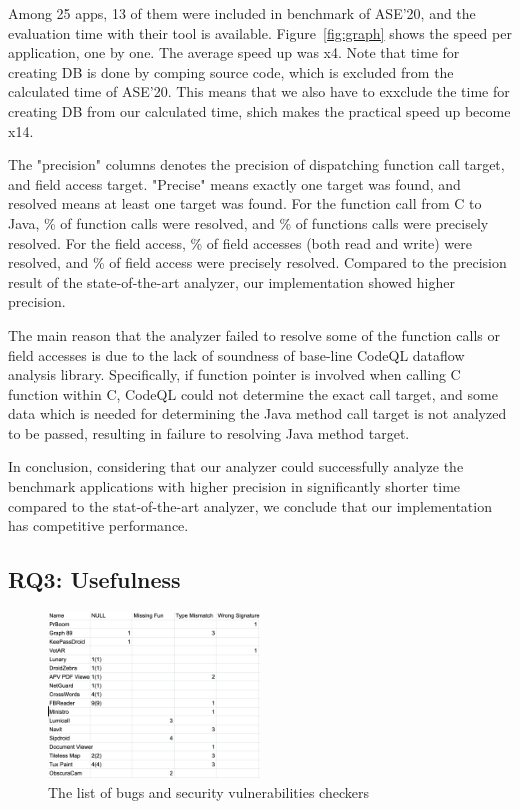 Among 25 apps, 13 of them were included in benchmark of ASE'20, and the
evaluation time with their tool is available.  Figure~\ref{fig:graph} shows the speed per
application, one by one.  The average speed up was x4. Note that time for
creating DB is done by comping source code, which is excluded from the calculated
time of ASE'20. This means that we also have to exxclude the time for creating DB
from our calculated time, shich makes the practical speed up become x14.

The "precision" columns denotes the precision of dispatching function call
target, and field access target.  "Precise" means exactly one target was found,
and resolved means at least one target was found. For the function call from C to Java,
\% of function calls were resolved, and \% of functions calls
were precisely resolved. For the field access, \% of field accesses (both
read and write) were resolved, and \% of field access were precisely resolved.
Compared to the precision result of the state-of-the-art analyzer, our implementation
showed higher precision.

The main reason that the analyzer failed to resolve some of the function calls
or field accesses is due to the lack of soundness of base-line CodeQL dataflow
analysis library.  Specifically, if function pointer is involved when calling C
function within C, CodeQL could not determine the exact call target, and some
data which is needed for determining the Java method call target is not
analyzed to be passed, resulting in failure to resolving Java method target.

In conclusion, considering that our analyzer could successfully analyze the
benchmark applications with higher precision in significantly shorter time
compared to the stat-of-the-art analyzer, we conclude that our implementation
has competitive performance.

\subsection{RQ3: Usefulness}
\begin{figure}[t]
  \centering
  \vspace{2mm}
  \includegraphics[width=0.5\textwidth]{img/table3}
  \vspace*{-1.5em}
  \caption{The list of bugs and security vulnerabilities checkers}
  \label{fig:table3}
\vspace*{-.5em}
\end{figure}

